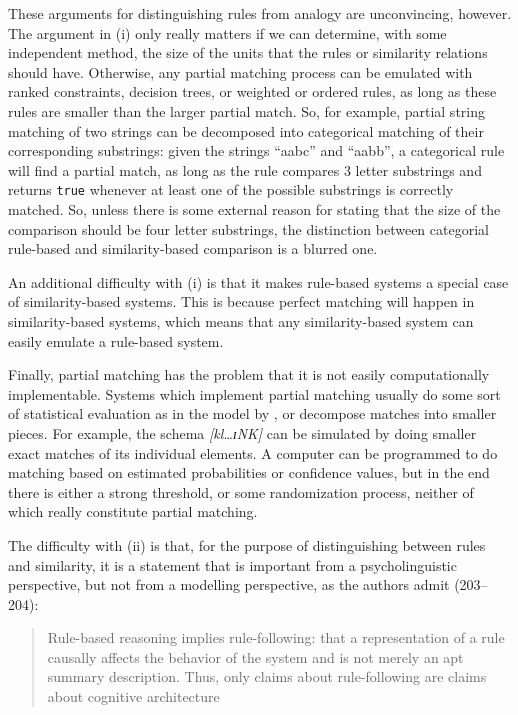 These arguments for distinguishing rules from analogy are unconvincing, however. The argument in (i) only really matters if we can determine, with some independent method, the size of the units that the rules or similarity relations should have. Otherwise, any partial matching process can be emulated with ranked constraints, decision trees, or weighted or ordered rules, as long as these rules are smaller than the larger partial match. So, for example, partial string matching of two strings can be decomposed into categorical matching of their corresponding substrings: given the strings ``aabc'' and ``aabb'', a categorical rule will find a partial match, as long as the rule compares 3 letter substrings and returns \texttt{true} whenever at least one of the possible substrings is correctly matched. So, unless there is some external reason for stating that the size of the comparison should be four letter substrings, the distinction between categorial rule-based and similarity-based comparison is a blurred one.

An additional difficulty with (i) is that it makes rule-based systems a special case of similar\-ity-based systems. This is because perfect matching will happen in similarity-based systems, which means that any similarity-based system can easily emulate a rule-based system.

Finally, partial matching has the problem that it is not easily computationally implementable. Systems which implement partial matching usually do some sort of statistical evaluation as in the model by \textcite{Albright.2003}, or decompose matches into smaller pieces. For example, the schema \textit{[kl\dots ɪNK]} can be simulated by doing smaller exact matches of its individual elements. A computer can be programmed to do matching based on estimated probabilities or confidence values, but in the end there is either a strong threshold, or some randomization process, neither of which really constitute partial matching.

The difficulty with (ii) is that, for the purpose of distinguishing between rules and similarity, it is a statement that is important from a psycholinguistic perspective, but not from a modelling perspective, as the authors admit (203--204):

\begin{quotation}
Rule-based reasoning implies rule-following: that a representation of a rule causally affects the behavior of the system and is not merely an apt summary description. Thus, only claims about rule-following are claims about cognitive architecture \autocite[203--204]{Hahn.1998}
\end{quotation}

